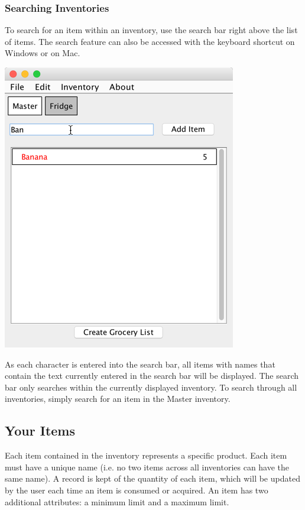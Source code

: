 \documentclass[letterpaper,12pt]{article}
\begin{document}
		

	\subsubsection{Searching Inventories}
To search for an item within an inventory, use the search bar right above the list of items. The search feature can also be accessed with the keyboard shortcut  on Windows or  on Mac.\\

\centerline{\includegraphics[scale=0.5]{18.png}}

As each character is entered into the search bar, all items with names that contain the text currently entered in the search bar will be displayed. The search bar only searches within the currently displayed inventory. To search through all inventories, simply search for an item in the Master inventory.

	\subsection{Your Items}
Each item contained in the inventory represents a specific product. Each item must have a unique name (i.e. no two items across all inventories can have the same name). A record is kept of the quantity of each item, which will be updated by the user each time an item is consumed or acquired. An item has two additional attributes: a minimum limit and a maximum limit.
\end{document}
